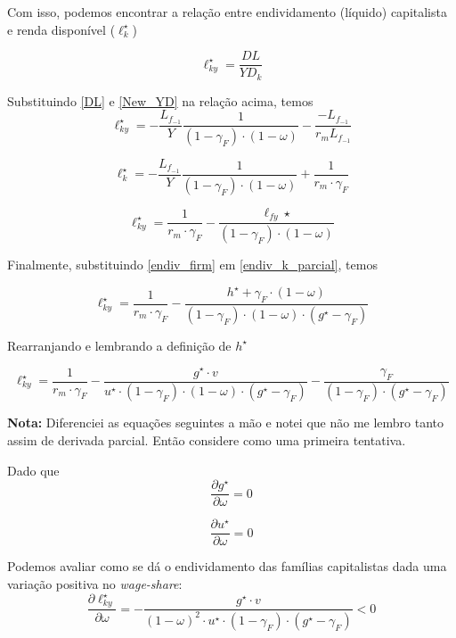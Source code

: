 \documentclass[11pt]{article}
\begin{document}
Com isso, podemos encontrar a relação entre endividamento (líquido) capitalista e renda disponível (\(\ell_k^\star\))

$$
\ell_{ky}^\star = \frac{DL}{YD_k}
$$

Substituindo \ref{DL} e \ref{New_YD} na relação acima, temos
\begin{equation}
\ell_{ky}^\star = -\frac{L_{f_{-1}}}{Y}\frac{1}{(1-\gamma_F)\cdot (1-\omega)} - \frac{-L_{f_{-1}}}{r_m L_{f_{-1}}}
\end{equation}

\begin{equation}
\ell_k^\star = -\frac{L_{f_{-1}}}{Y}\frac{1}{(1-\gamma_F)\cdot (1-\omega)} + \frac{1}{r_m\cdot \gamma_F}
\end{equation}

\begin{equation}
\label{endiv_k_parcial}
\ell_{ky}^\star = \frac{1}{r_m\cdot \gamma_F} - \frac{\ell_{fy}\star}{(1-\gamma_F)\cdot (1-\omega)}
\end{equation}

Finalmente, substituindo \ref{endiv_firm} em \ref{endiv_k_parcial}, temos

\begin{equation}
\ell_{ky}^\star = \frac{1}{r_m\cdot \gamma_F} - \frac{h^\star + \gamma_F\cdot (1-\omega)}{(1-\gamma_F)\cdot (1-\omega)\cdot (g^\star - \gamma_F)}
\end{equation}

Rearranjando e lembrando a definição de \(h^\star\)

\begin{equation}
\ell_{ky}^\star = \frac{1}{r_m\cdot \gamma_F} - \frac{g^\star\cdot v}{u^\star \cdot (1-\gamma_F)\cdot (1-\omega)\cdot (g^\star - \gamma_F)} - \frac{\gamma_F}{(1-\gamma_F)\cdot (g^\star - \gamma_F)}
\end{equation}

\textbf{Nota:} Diferenciei as equações seguintes a mão e notei que não me lembro tanto assim de derivada parcial. Então considere como uma primeira tentativa.

Dado que
$$
\frac{\partial g^\star}{\partial \omega} = 0
$$

$$
\frac{\partial u^\star}{\partial \omega} = 0
$$


Podemos avaliar como se dá o endividamento das famílias capitalistas dada uma variação positiva no \emph{wage-share}:
$$
\frac{\partial \ell_{ky}^\star}{\partial \omega} = -\frac{g^\star\cdot v}{(1-\omega)^2\cdot u^\star \cdot (1-\gamma_F)\cdot (g^\star - \gamma_F)} < 0
$$
\end{document}
